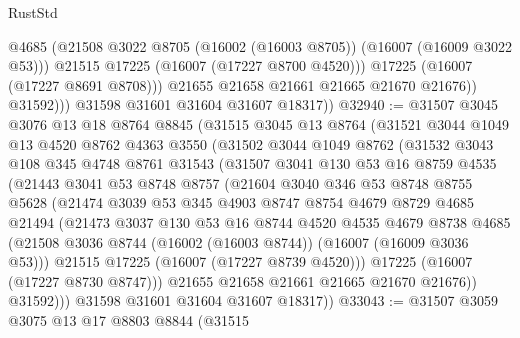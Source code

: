 \begin{lexlean}{RustStd}
\begin{coremodule}
                      @4685
                      (@21508 @3022 @8705 (@16002 (@16003 @8705)) (@16007 (@16009 @3022 @53)))
                      @21515
                      @17225
                      (@16007 (@17227 @8700 @4520)))
                    @17225
                    (@16007 (@17227 @8691 @8708)))
                  @21655
                  @21658
                  @21661
                  @21665
                  @21670
                  @21676))
              @31592)))
        @31598
        @31601
        @31604
        @31607
        @18317))
@32940 := @31507
    @3045
    @3076
    @13
    @18
    @8764
    @8845
    (@31515
      @3045
      @13
      @8764
      (@31521
        @3044
        @1049
        @13
        @4520
        @8762
        @4363
        @3550
        (@31502
          @3044
          @1049
          @8762
          (@31532
            @3043
            @108
            @345
            @4748
            @8761
            @31543
            (@31507
              @3041
              @130
              @53
              @16
              @8759
              @4535
              (@21443
                @3041
                @53
                @8748
                @8757
                (@21604
                  @3040
                  @346
                  @53
                  @8748
                  @8755
                  @5628
                  (@21474
                    @3039
                    @53
                    @345
                    @4903
                    @8747
                    @8754
                    @4679
                    @8729
                    @4685
                    @21494
                    (@21473
                      @3037
                      @130
                      @53
                      @16
                      @8744
                      @4520
                      @4535
                      @4679
                      @8738
                      @4685
                      (@21508 @3036 @8744 (@16002 (@16003 @8744)) (@16007 (@16009 @3036 @53)))
                      @21515
                      @17225
                      (@16007 (@17227 @8739 @4520)))
                    @17225
                    (@16007 (@17227 @8730 @8747)))
                  @21655
                  @21658
                  @21661
                  @21665
                  @21670
                  @21676))
              @31592)))
        @31598
        @31601
        @31604
        @31607
        @18317))
@33043 := @31507
    @3059
    @3075
    @13
    @17
    @8803
    @8844
    (@31515

\end{coremodule}
\end{lexlean}
